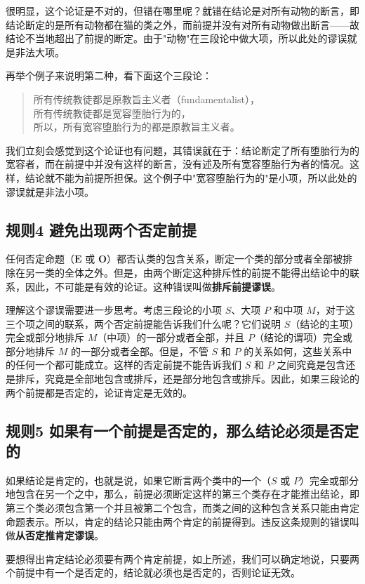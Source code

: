 很明显，这个论证是不对的，但错在哪里呢？就错在结论是对所有动物的断言，即结论断定的是所有动物都在猫的类之外，而前提并没有对所有动物做出断言——故结论不当地超出了前提的断定。由于"动物"在三段论中做大项，所以此处的谬误就是非法大项。

再举个例子来说明第二种，看下面这个三段论：

\begin{quote}
所有传统教徒都是原教旨主义者（fundamentalist），\\
所有传统教徒都是宽容堕胎行为的，\\
所以，所有宽容堕胎行为的都是原教旨主义者。
\end{quote}

我们立刻会感觉到这个论证也有问题，其错误就在于：结论断定了所有堕胎行为的宽容者，而在前提中并没有这样的断言，没有述及所有宽容堕胎行为者的情况。这样，结论就不能为前提所担保。这个例子中"宽容堕胎行为的"是小项，所以此处的谬误就是非法小项。

\subsection{规则4 避免出现两个否定前提}
任何否定命题（$\mathbf{E}$ 或 $\mathbf{O}$）都否认类的包含关系，断定一个类的部分或者全部被排除在另一类的全体之外。但是，由两个断定这种排斥性的前提不能得出结论中的联系，因此，不可能是有效的论证。这种错误叫做\textbf{排斥前提谬误}。

理解这个谬误需要进一步思考。考虑三段论的小项 $S$、大项 $P$ 和中项 $M$，对于这三个项之间的联系，两个否定前提能告诉我们什么呢？它们说明 $S$（结论的主项）完全或部分地排斥 $M$（中项）的一部分或者全部，并且 $P$（结论的谓项）完全或部分地排斥 $M$ 的一部分或者全部。但是，不管 $S$ 和 $P$ 的关系如何，这些关系中的任何一个都可能成立。这样的否定前提不能告诉我们 $S$ 和 $P$ 之间究竟是包含还是排斥，究竟是全部地包含或排斥，还是部分地包含或排斥。因此，如果三段论的两个前提都是否定的，论证肯定是无效的。

\subsection{规则5 如果有一个前提是否定的，那么结论必须是否定的}
如果结论是肯定的，也就是说，如果它断言两个类中的一个（$S$ 或 $P$）完全或部分地包含在另一个之中，那么，前提必须断定这样的第三个类存在才能推出结论，即第三个类必须包含第一个并且被第二个包含，而类之间的这种包含关系只能由肯定命题表示。所以，肯定的结论只能由两个肯定的前提得到。违反这条规则的错误叫做\textbf{从否定推肯定谬误}。

要想得出肯定结论必须要有两个肯定前提，如上所述，我们可以确定地说，只要两个前提中有一个是否定的，结论就必须也是否定的，否则论证无效。

